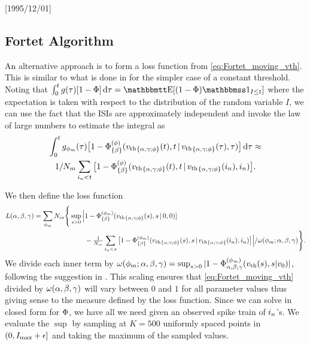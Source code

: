 \NeedsTeXFormat{LaTeX2e}[1995/12/01] \documentclass[10pt]{bmc_article}
\newenvironment{bmcformat}{\begin{raggedright}\baselineskip20pt\sloppy\setboolean{publ}{false}}{\end{raggedright}\baselineskip20pt\sloppy}
\begin{document}
\begin{bmcformat}
\subsection{Fortet Algorithm}
An alternative approach is to form a loss function from
\cref{eq:Fortet_moving_vth}. This is similar to what is done in
\cite{Ditlevsen2008,Ditlevsen2007} for the simpler case of a constant threshold.
Noting that $\int_0^t g (\t) [1-\F ] \intd{\t} = \Exp[ (1 - \F ) \charf_{I \leq
t} ]$ where the expectation is taken with respect to the distribution of the
random variable $I$, we can use the fact that the ISIs are approximately
independent and invoke the law of large numbers to estimate the integral as
\begin{multline*}
\int_0^t g_{\phi_m}({\tau}) 
\big[1-{\Phi}^{(\phi)}_{\{{\beta}\}}({ v_{\textrm{th} } }_{\{{\alpha},{\gamma };\phi\}}(t),  t \,|\,
{ v_{\textrm{th} } }_{\{{\alpha},{\gamma };\phi\}}({\tau}), {\tau}) \big] \, \mathrm{d} {\tau} \approx 
\\
1/N_m \sum_{{ i_n} < t} 
\big[1
- {\Phi}^{(\phi)}_{\{{\beta}\}}({ v_{\textrm{th} } }_{\{{\alpha},{\gamma };\phi\}}(t), t \,|\,
{ v_{\textrm{th} } }_{\{{\alpha},{\gamma };\phi\}}({ i_n}),{ i_n} )\big].
\end{multline*}


We then define the loss function
\begin{align}
L({\alpha},{\beta},{\gamma }) = 
\sum_{\phi_m} N_m \Bigg\{ 
\sup_{s > 0}
		 \Big|& 1 - {\Phi}^{(\phi_m)}_{\{{\beta}\}}({ v_{\textrm{th} } }_{\{{\alpha},{\gamma };\phi\}}(s), s \,|\,0,0) ] 
		 \notag
\\
		 &-  \tfrac{1}{N_m}\sum_{{ i_n} < s}
		 \big[1 - {\Phi}^{(\phi_m)}_{\{{\beta}\}}({ v_{\textrm{th} } }_{\{{\alpha},{\gamma };\phi\}}(s),s  \,|\,
		 { v_{\textrm{th} } }_{\{{\alpha},{\gamma };\phi\}}({ i_n}), { i_n}) \big] \Big| / \omega(\phi_m; {\alpha},{\beta},{\gamma })
		   \Bigg\}.
\label{eq:loss_function_fortet}
\end{align}
We divide each inner term by $\omega(\phi_m; {\alpha},{\beta},{\gamma }) =
\sup_{s > 0} |1 - {\Phi}^{(\phi_m)}_{{{\alpha},{\beta},{\gamma } }}({ v_{\textrm{th} } }(s), s|v_0) |$,
following the suggestion in
\cite{Ditlevsen2007}. This scaling ensures that \cref{eq:Fortet_moving_vth}
divided by $\omega({\alpha},{\beta},{\gamma })$ will vary between $0$ and $1$ for all parameter
values thus giving sense to the measure defined by the loss
function. Since we can solve in closed form for ${\Phi}$, we have all we
need given an observed spike train of 
${ i_n}$'s. We evaluate the $\sup$ by sampling at 
$K=500$ uniformly spaced points in $(0, I_{\max} + {\epsilon}]$ and taking the maximum
of the sampled values. 



\end{bmcformat}
\end{document}
